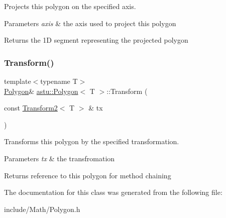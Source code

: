 Projects this polygon on the specified axis.


\begin{DoxyParams}{Parameters}
{\em axis} & the axis used to project this polygon \\
\hline
\end{DoxyParams}
\begin{DoxyReturn}{Returns}
the 1D segment representing the projected polygon 
\end{DoxyReturn}
\mbox{\label{classastu_1_1Polygon_a9bf40bc43bd08d4293583c146bab4d68}} 
\subsubsection{\texorpdfstring{Transform()}{Transform()}}
{\footnotesize\ttfamily template$<$typename T$>$ \\
\hyperlink{classastu_1_1Polygon}{Polygon}\& \hyperlink{classastu_1_1Polygon}{astu\+::\+Polygon}$<$ T $>$\+::Transform (\begin{DoxyParamCaption}\item[{const \hyperlink{classastu_1_1Transform2}{Transform2}$<$ T $>$ \&}]{tx }\end{DoxyParamCaption})\hspace{0.3cm}{\ttfamily [inline]}}

Transforms this polygon by the specified transformation.


\begin{DoxyParams}{Parameters}
{\em tx} & the transfromation \\
\hline
\end{DoxyParams}
\begin{DoxyReturn}{Returns}
reference to this polygon for method chaining 
\end{DoxyReturn}


The documentation for this class was generated from the following file\+:\begin{DoxyCompactItemize}
\item 
include/\+Math/Polygon.\+h\end{DoxyCompactItemize}
